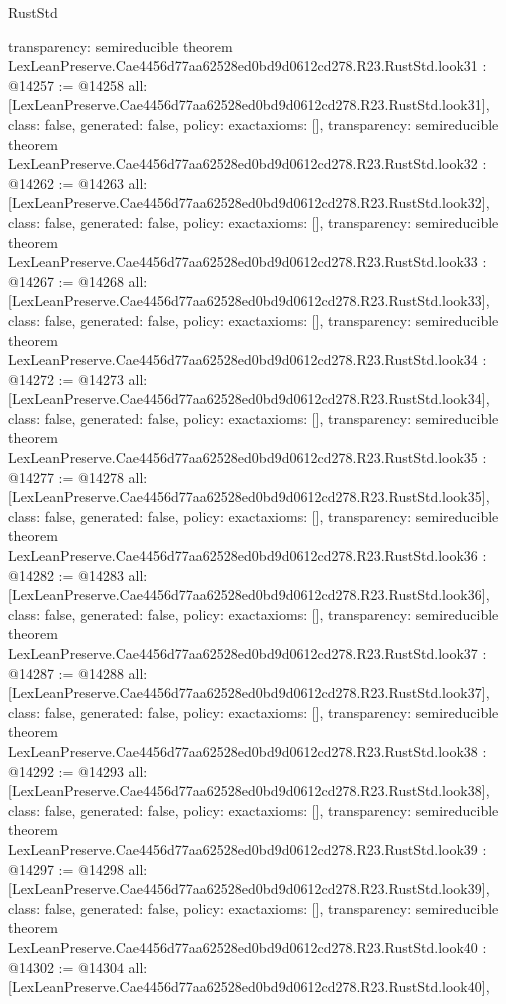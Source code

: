 \begin{lexlean}{RustStd}
\begin{coremodule}
{  transparency: semireducible
}
theorem LexLeanPreserve.Cae4456d77aa62528ed0bd9d0612cd278.R23.RustStd.look31 : @14257 := @14258 {
  all: [LexLeanPreserve.Cae4456d77aa62528ed0bd9d0612cd278.R23.RustStd.look31],
  class: false,
  generated: false,
  policy: exact{axioms: []},
  transparency: semireducible
}
theorem LexLeanPreserve.Cae4456d77aa62528ed0bd9d0612cd278.R23.RustStd.look32 : @14262 := @14263 {
  all: [LexLeanPreserve.Cae4456d77aa62528ed0bd9d0612cd278.R23.RustStd.look32],
  class: false,
  generated: false,
  policy: exact{axioms: []},
  transparency: semireducible
}
theorem LexLeanPreserve.Cae4456d77aa62528ed0bd9d0612cd278.R23.RustStd.look33 : @14267 := @14268 {
  all: [LexLeanPreserve.Cae4456d77aa62528ed0bd9d0612cd278.R23.RustStd.look33],
  class: false,
  generated: false,
  policy: exact{axioms: []},
  transparency: semireducible
}
theorem LexLeanPreserve.Cae4456d77aa62528ed0bd9d0612cd278.R23.RustStd.look34 : @14272 := @14273 {
  all: [LexLeanPreserve.Cae4456d77aa62528ed0bd9d0612cd278.R23.RustStd.look34],
  class: false,
  generated: false,
  policy: exact{axioms: []},
  transparency: semireducible
}
theorem LexLeanPreserve.Cae4456d77aa62528ed0bd9d0612cd278.R23.RustStd.look35 : @14277 := @14278 {
  all: [LexLeanPreserve.Cae4456d77aa62528ed0bd9d0612cd278.R23.RustStd.look35],
  class: false,
  generated: false,
  policy: exact{axioms: []},
  transparency: semireducible
}
theorem LexLeanPreserve.Cae4456d77aa62528ed0bd9d0612cd278.R23.RustStd.look36 : @14282 := @14283 {
  all: [LexLeanPreserve.Cae4456d77aa62528ed0bd9d0612cd278.R23.RustStd.look36],
  class: false,
  generated: false,
  policy: exact{axioms: []},
  transparency: semireducible
}
theorem LexLeanPreserve.Cae4456d77aa62528ed0bd9d0612cd278.R23.RustStd.look37 : @14287 := @14288 {
  all: [LexLeanPreserve.Cae4456d77aa62528ed0bd9d0612cd278.R23.RustStd.look37],
  class: false,
  generated: false,
  policy: exact{axioms: []},
  transparency: semireducible
}
theorem LexLeanPreserve.Cae4456d77aa62528ed0bd9d0612cd278.R23.RustStd.look38 : @14292 := @14293 {
  all: [LexLeanPreserve.Cae4456d77aa62528ed0bd9d0612cd278.R23.RustStd.look38],
  class: false,
  generated: false,
  policy: exact{axioms: []},
  transparency: semireducible
}
theorem LexLeanPreserve.Cae4456d77aa62528ed0bd9d0612cd278.R23.RustStd.look39 : @14297 := @14298 {
  all: [LexLeanPreserve.Cae4456d77aa62528ed0bd9d0612cd278.R23.RustStd.look39],
  class: false,
  generated: false,
  policy: exact{axioms: []},
  transparency: semireducible
}
theorem LexLeanPreserve.Cae4456d77aa62528ed0bd9d0612cd278.R23.RustStd.look40 : @14302 := @14304 {
  all: [LexLeanPreserve.Cae4456d77aa62528ed0bd9d0612cd278.R23.RustStd.look40],
}
\end{coremodule}
\end{lexlean}
